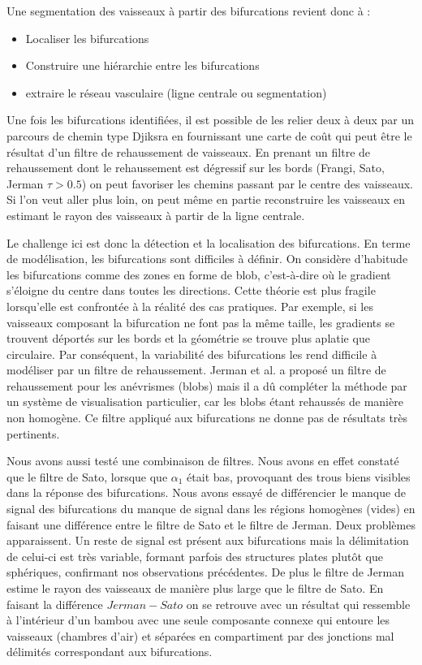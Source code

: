 Une segmentation des vaisseaux à partir des bifurcations revient donc à :

\begin{itemize}
\item Localiser les bifurcations
\item Construire une hiérarchie entre les bifurcations
\item extraire le réseau vasculaire (ligne centrale ou segmentation)
\end{itemize}

Une fois les bifurcations identifiées, il est possible de les relier deux à deux par un parcours de chemin type Djiksra en fournissant une carte de coût qui peut être le résultat d'un filtre de rehaussement de vaisseaux. En prenant un filtre de rehaussement dont le rehaussement est dégressif sur les bords (Frangi, Sato, Jerman $\tau > 0.5$) on peut favoriser les chemins passant par le centre des vaisseaux. Si l'on veut aller plus loin, on peut même en partie reconstruire les vaisseaux en estimant le rayon des vaisseaux à partir de la ligne centrale.

Le challenge ici est donc la détection et la localisation des bifurcations. En terme de modélisation, les bifurcations sont difficiles à définir. On considère d'habitude les bifurcations comme des zones en forme de blob, c'est-à-dire où le gradient s'éloigne du centre dans toutes les directions. Cette théorie est plus fragile lorsqu'elle est confrontée à la réalité des cas pratiques. Par exemple, si les vaisseaux composant la bifurcation ne font pas la même taille, les gradients se trouvent déportés sur les bords et la géométrie se trouve plus aplatie que circulaire. Par conséquent, la variabilité des bifurcations les rend difficile à modéliser par un filtre de rehaussement. Jerman et al. a proposé un filtre de rehaussement pour les anévrismes (blobs) mais il a dû compléter la méthode par un système de visualisation particulier, car les blobs étant rehaussés de manière non homogène. Ce filtre appliqué aux bifurcations ne donne pas de résultats très pertinents.

Nous avons aussi testé une combinaison de filtres. Nous avons en effet constaté que le filtre de Sato, lorsque que $\alpha_1$ était bas, provoquant des trous biens visibles dans la réponse des bifurcations. Nous avons essayé de différencier le manque de signal des bifurcations du manque de signal dans les régions homogènes (vides) en faisant une différence entre le filtre de Sato et le filtre de Jerman. Deux problèmes apparaissent. Un reste de signal est présent aux bifurcations mais la délimitation de celui-ci est très variable, formant parfois des structures plates plutôt que sphériques, confirmant nos observations précédentes. De plus le filtre de Jerman estime le rayon des vaisseaux de manière plus large que le filtre de Sato. En faisant la différence $Jerman-Sato$ on se retrouve avec un résultat qui ressemble à l'intérieur d'un bambou avec une seule composante connexe qui entoure les vaisseaux (chambres d'air) et séparées en compartiment par des jonctions mal délimités correspondant aux bifurcations.

